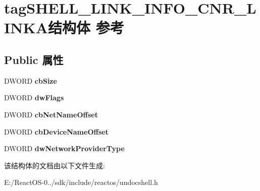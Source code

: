 \hypertarget{structtag_s_h_e_l_l___l_i_n_k___i_n_f_o___c_n_r___l_i_n_k_a}{}\section{tag\+S\+H\+E\+L\+L\+\_\+\+L\+I\+N\+K\+\_\+\+I\+N\+F\+O\+\_\+\+C\+N\+R\+\_\+\+L\+I\+N\+K\+A结构体 参考}
\label{structtag_s_h_e_l_l___l_i_n_k___i_n_f_o___c_n_r___l_i_n_k_a}
\subsection*{Public 属性}
\begin{DoxyCompactItemize}
\item 
\mbox{\label{structtag_s_h_e_l_l___l_i_n_k___i_n_f_o___c_n_r___l_i_n_k_a_a8517dc802c94ff88b4a063bcd6fc13e1}} 
D\+W\+O\+RD {\bfseries cb\+Size}
\item 
\mbox{\label{structtag_s_h_e_l_l___l_i_n_k___i_n_f_o___c_n_r___l_i_n_k_a_a06d145b0f7b8d0ae3fe42ef6777ac28c}} 
D\+W\+O\+RD {\bfseries dw\+Flags}
\item 
\mbox{\label{structtag_s_h_e_l_l___l_i_n_k___i_n_f_o___c_n_r___l_i_n_k_a_a47a0b62297f857beaa6a89fd0b48ac05}} 
D\+W\+O\+RD {\bfseries cb\+Net\+Name\+Offset}
\item 
\mbox{\label{structtag_s_h_e_l_l___l_i_n_k___i_n_f_o___c_n_r___l_i_n_k_a_a804f19d3d5594e714c88ad8b358bac31}} 
D\+W\+O\+RD {\bfseries cb\+Device\+Name\+Offset}
\item 
\mbox{\label{structtag_s_h_e_l_l___l_i_n_k___i_n_f_o___c_n_r___l_i_n_k_a_aee1f9f7114ca272b96dadb257d4ce056}} 
D\+W\+O\+RD {\bfseries dw\+Network\+Provider\+Type}
\end{DoxyCompactItemize}


该结构体的文档由以下文件生成\+:\begin{DoxyCompactItemize}
\item 
E\+:/\+React\+O\+S-\/0../sdk/include/reactos/undocshell.\+h\end{DoxyCompactItemize}
